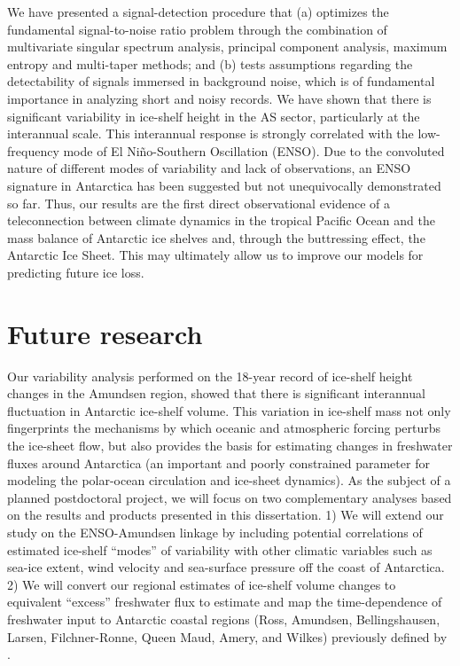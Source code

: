 We have presented a signal-detection procedure that (a) optimizes the fundamental signal-to-noise ratio problem through the combination of multivariate singular spectrum analysis, principal component analysis, maximum entropy and multi-taper methods; and (b) tests assumptions regarding the detectability of signals immersed in background noise, which is of fundamental importance in analyzing short and noisy records. We have shown that there is significant variability in ice-shelf height in the AS sector, particularly at the interannual scale. This interannual response is strongly correlated with the low-frequency mode of El Ni\~no-Southern Oscillation (ENSO). Due to the convoluted nature of different modes of variability and lack of observations, an ENSO signature in Antarctica has been suggested but not unequivocally demonstrated so far. Thus, our results are the first direct observational evidence of a teleconnection between climate dynamics in the tropical Pacific Ocean and the mass balance of Antarctic ice shelves and, through the buttressing effect, the Antarctic Ice Sheet. This may ultimately allow us to improve our models for predicting future ice loss.

\section{Future research}

\noindent
Our variability analysis performed on the 18-year record of ice-shelf height changes in the Amundsen region, showed that there is significant interannual fluctuation in Antarctic ice-shelf volume. This variation in ice-shelf mass not only fingerprints the mechanisms by which oceanic and atmospheric forcing perturbs the ice-sheet flow, but also provides the basis for estimating changes in freshwater fluxes around Antarctica (an important and poorly constrained parameter for modeling the polar-ocean circulation and ice-sheet dynamics). As the subject of a planned postdoctoral project, we will focus on two complementary analyses based on the results and products presented in this dissertation. 1) We will extend our study on the ENSO-Amundsen linkage by including potential correlations of estimated ice-shelf ``modes'' of variability with other climatic variables such as sea-ice extent, wind velocity and sea-surface pressure off the coast of Antarctica. 2) We will convert our regional estimates of ice-shelf volume changes to equivalent ``excess'' freshwater flux to estimate and map the time-dependence of freshwater input to Antarctic coastal regions (Ross, Amundsen, Bellingshausen, Larsen, Filchner-Ronne, Queen Maud, Amery, and Wilkes) previously defined by \textcite{Paolo2015}. 
